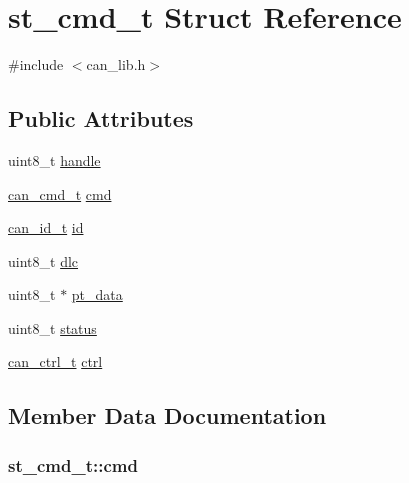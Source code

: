 \hypertarget{structst__cmd__t}{}\section{st\+\_\+cmd\+\_\+t Struct Reference}
\label{structst__cmd__t}


{\ttfamily \#include $<$can\+\_\+lib.\+h$>$}

\subsection*{Public Attributes}
\begin{DoxyCompactItemize}
\item 
uint8\+\_\+t \hyperlink{structst__cmd__t_a3bc2a93e0f03e5f2dd0fbf95ae64629f}{handle}
\item 
\hyperlink{can__lib_8h_a5abd3fd6ef910f3c816ce728b09b0674}{can\+\_\+cmd\+\_\+t} \hyperlink{structst__cmd__t_a803e12371a11db6476387a27a6711f25}{cmd}
\item 
\hyperlink{unioncan__id__t}{can\+\_\+id\+\_\+t} \hyperlink{structst__cmd__t_ae75c876a8dae84e253cd608eec063509}{id}
\item 
uint8\+\_\+t \hyperlink{structst__cmd__t_a0f1031116dcd5cc10d4afee0550363ba}{dlc}
\item 
uint8\+\_\+t $\ast$ \hyperlink{structst__cmd__t_ae05e1151e43aa47bc183090fb7893235}{pt\+\_\+data}
\item 
uint8\+\_\+t \hyperlink{structst__cmd__t_ab86b81f85afb26d6bd078854dda95759}{status}
\item 
\hyperlink{structcan__ctrl__t}{can\+\_\+ctrl\+\_\+t} \hyperlink{structst__cmd__t_a3d95eb98ae7729796e358656a25605a3}{ctrl}
\end{DoxyCompactItemize}


\subsection{Member Data Documentation}
\subsubsection[{\texorpdfstring{cmd}{cmd}}]{ st\+\_\+cmd\+\_\+t\+::cmd}\hypertarget{structst__cmd__t_a803e12371a11db6476387a27a6711f25}{}\label{structst__cmd__t_a803e12371a11db6476387a27a6711f25}
